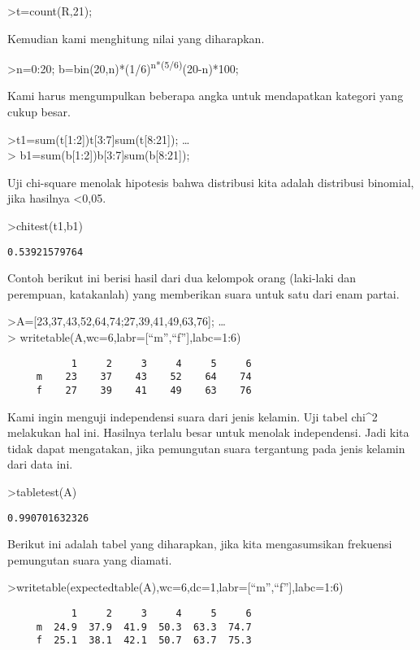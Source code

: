 \documentclass[
]{book}
\begin{document}
\textgreater t=count(R,21);

Kemudian kami menghitung nilai yang diharapkan.

\textgreater n=0:20; b=bin(20,n)*(1/6)\textsuperscript{n*(5/6)}(20-n)*100;

Kami harus mengumpulkan beberapa angka untuk mendapatkan kategori yang cukup besar.

\textgreater t1=sum(t{[}1:2{]})\textbar t{[}3:7{]}\textbar sum(t{[}8:21{]}); \ldots{}\\
\textgreater{} b1=sum(b{[}1:2{]})\textbar b{[}3:7{]}\textbar sum(b{[}8:21{]});

Uji chi-square menolak hipotesis bahwa distribusi kita adalah distribusi binomial, jika hasilnya \textless0,05.

\textgreater chitest(t1,b1)

\begin{verbatim}
0.53921579764
\end{verbatim}

Contoh berikut ini berisi hasil dari dua kelompok orang (laki-laki dan perempuan, katakanlah) yang memberikan suara untuk satu dari enam partai.

\textgreater A={[}23,37,43,52,64,74;27,39,41,49,63,76{]}; \ldots{}\\
\textgreater{} writetable(A,wc=6,labr={[}``m'',``f''{]},labc=1:6)

\begin{verbatim}
           1     2     3     4     5     6
     m    23    37    43    52    64    74
     f    27    39    41    49    63    76
\end{verbatim}

Kami ingin menguji independensi suara dari jenis kelamin. Uji tabel chi\^{}2 melakukan hal ini. Hasilnya terlalu besar untuk menolak independensi. Jadi kita tidak dapat mengatakan, jika pemungutan suara tergantung pada jenis kelamin dari data ini.

\textgreater tabletest(A)

\begin{verbatim}
0.990701632326
\end{verbatim}

Berikut ini adalah tabel yang diharapkan, jika kita mengasumsikan frekuensi pemungutan suara yang diamati.

\textgreater writetable(expectedtable(A),wc=6,dc=1,labr={[}``m'',``f''{]},labc=1:6)

\begin{verbatim}
           1     2     3     4     5     6
     m  24.9  37.9  41.9  50.3  63.3  74.7
     f  25.1  38.1  42.1  50.7  63.7  75.3
\end{verbatim}
\end{document}
